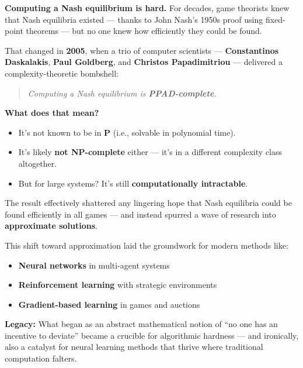 \begin{tcolorbox}[colback=gray!5!white, colframe=black, title=\textbf{Sidebar: When Nash Met Complexity Theory (2005)}]

    \textbf{Computing a Nash equilibrium is hard.} For decades, game theorists knew that Nash equilibria existed — thanks to John Nash’s 1950s proof using fixed-point theorems — but no one knew how efficiently they could be found.
    
    That changed in \textbf{2005}, when a trio of computer scientists — \textbf{Constantinos Daskalakis}, \textbf{Paul Goldberg}, and \textbf{Christos Papadimitriou} — delivered a complexity-theoretic bombshell: 
    
    \begin{quote}
    \textit{Computing a Nash equilibrium is \textbf{PPAD-complete}.}
    \end{quote}
    
    \vspace{0.5em}
    
    \textbf{What does that mean?}
    \begin{itemize}
        \item It's not known to be in \textbf{P} (i.e., solvable in polynomial time).
        \item It's likely \textbf{not NP-complete} either — it's in a different complexity class altogether.
        \item But for large systems? It's still \textbf{computationally intractable}.
    \end{itemize}
    
    The result effectively shattered any lingering hope that Nash equilibria could be found efficiently in all games — and instead spurred a wave of research into \textbf{approximate solutions}. 
    
    This shift toward approximation laid the groundwork for modern methods like:
    \begin{itemize}
        \item \textbf{Neural networks} in multi-agent systems
        \item \textbf{Reinforcement learning} with strategic environments
        \item \textbf{Gradient-based learning} in games and auctions
    \end{itemize}
    
    \vspace{0.5em}
    
    \textbf{Legacy:} What began as an abstract mathematical notion of “no one has an incentive to deviate” became a crucible for algorithmic hardness — and ironically, also a catalyst for neural learning methods that thrive where traditional computation falters.
    
\end{tcolorbox}
